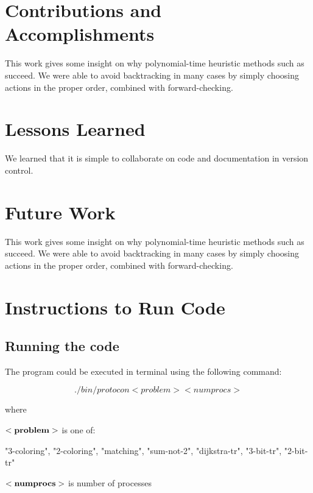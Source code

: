 \section{Contributions and Accomplishments}

This work gives some insight on why polynomial-time heuristic methods such as \cite{ipdpsEbnenasir11} succeed.
We were able to avoid backtracking in many cases by simply choosing actions in the proper order, combined with forward-checking.

\section{Lessons Learned}

We learned that it is simple to collaborate on code and documentation in version control.

\section{Future Work}

This work gives some insight on why polynomial-time heuristic methods such as \cite{ipdpsEbnenasir11} succeed.
We were able to avoid backtracking in many cases by simply choosing actions in the proper order, combined with forward-checking.

\section{Instructions to Run Code}
\subsection{Running the code}
The program could be executed in terminal using the following command:

\[
  ./bin/protocon <problem> <numprocs>
\]

where

$\bf{<problem>}$ is one of:

"3-coloring", "2-coloring", "matching", "sum-not-2", "dijkstra-tr", "3-bit-tr", "2-bit-tr"

$\bf{<numprocs>}$ is number of processes

